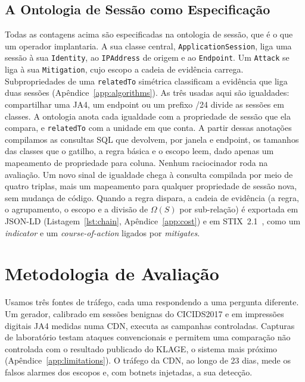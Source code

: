 \documentclass[conference,letterpaper,10pt]{IEEEtran}
\newcommand\1{\textit{(i)}}
\newcommand\2{\textit{(ii)}}
\newcommand\3{\textit{(iii)}}
\begin{document}
\subsection{A Ontologia de Sessão como Especificação}
\label{sec:ontology}
\label{sec:pipeline}

Todas as contagens acima são especificadas na ontologia de sessão, que é o que um operador implantaria. A sua classe central, \texttt{ApplicationSession}, liga uma sessão à sua \texttt{Identity}, ao \texttt{IPAddress} de origem e ao \texttt{Endpoint}. Um \texttt{Attack} se liga à sua \texttt{Mitigation}, cujo escopo a cadeia de evidência carrega. Subpropriedades de uma \texttt{relatedTo} simétrica classificam a evidência que liga duas sessões (Apêndice~\ref{app:algorithms}). As três usadas aqui são igualdades: compartilhar uma JA4, um endpoint ou um prefixo /24 divide as sessões em classes. A ontologia anota cada igualdade com a propriedade de sessão que ela compara, e \texttt{relatedTo} com a unidade em que conta. A partir dessas anotações compilamos as consultas SQL que devolvem, por janela e endpoint, os tamanhos das classes que o gatilho, a regra básica e o escopo leem, dado apenas um mapeamento de propriedade para coluna. Nenhum raciocinador roda na avaliação. Um novo sinal de igualdade chega à consulta compilada por meio de quatro triplas, mais um mapeamento para qualquer propriedade de sessão nova, sem mudança de código. Quando a regra dispara, a cadeia de evidência (a regra, o agrupamento, o escopo e a divisão de $\Omega(S)$ por sub-relação) é exportada em JSON-LD (Listagem~\ref{lst:chain}, Apêndice~\ref{app:cost}) e em STIX~2.1~\cite{oasis2021stix}, como um \textit{indicator} e um \textit{course-of-action} ligados por \textit{mitigates}.

\section{Metodologia de Avaliação}
\label{sec:method}

Usamos três fontes de tráfego, cada uma respondendo a uma pergunta diferente. Um gerador, calibrado em sessões benignas do CICIDS2017 e em impressões digitais JA4 medidas numa CDN, executa as campanhas controladas. Capturas de laboratório testam ataques convencionais e permitem uma comparação não controlada com o resultado publicado do KLAGE, o sistema mais próximo (Apêndice~\ref{app:limitations}). O tráfego da CDN, ao longo de 23 dias, mede os falsos alarmes dos escopos e, com botnets injetadas, a sua detecção.
\end{document}
